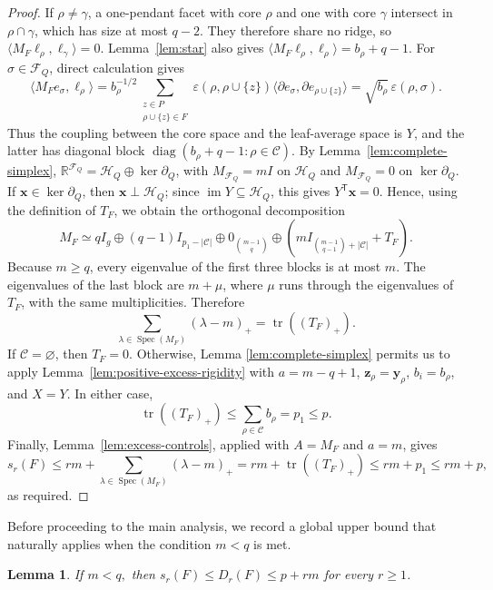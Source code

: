 \documentclass[11pt]{article}
\newtheorem{lemma}[theorem]{Lemma}
\newcommand{\tr}{\operatorname{tr}}
\newcommand{\Spec}{\operatorname{Spec}}
\newcommand{\im}{\operatorname{im}}
\newcommand{\Ker}{\operatorname{ker}}
\newcommand{\diag}{\operatorname{diag}}
\newcommand{\calC}{\mathcal{C}}
\newcommand{\calF}{\mathcal{F}}
\newcommand{\scrH}{\mathscr{H}}
\begin{document}
\begin{proof}
If \(\rho\neq\gamma\), a one-pendant facet with core \(\rho\) and one
with core \(\gamma\) intersect in \(\rho\cap\gamma\), which has size at
most \(q-2\). They therefore share no ridge, so
\(\langle M_F\boldsymbol{\ell}_\rho,
\boldsymbol{\ell}_\gamma\rangle=0\).
Lemma~\ref{lem:star} also gives
\(\langle M_F\boldsymbol{\ell}_\rho,
\boldsymbol{\ell}_\rho\rangle=b_\rho+q-1\).
For \(\sigma\in\calF_Q\), direct calculation gives
\[
\langle M_Fe_\sigma,\boldsymbol{\ell}_\rho\rangle
=
b_\rho^{-1/2}
\sum_{\substack{z\in P\\ \rho\cup\{z\}\in F}}
\varepsilon(\rho,\rho\cup\{z\})
\langle\partial e_\sigma,\partial e_{\rho\cup\{z\}}\rangle
=
\sqrt{b_\rho}\,\varepsilon(\rho,\sigma).
\]
Thus the coupling between the core space and the leaf-average space is
\(Y\), and the latter has diagonal block
\(\diag(b_\rho+q-1:\rho\in\calC)\).
By Lemma~\ref{lem:complete-simplex},
\(\mathbb R^{\calF_Q}=\scrH_Q\oplus\Ker\partial_Q\),
with \(M_{\calF_Q}=mI\) on \(\scrH_Q\) and \(M_{\calF_Q}=0\) on
\(\Ker\partial_Q\). If \(\mathbf x\in\Ker\partial_Q\), then
\(\mathbf x\perp\scrH_Q\); since \(\im Y\subseteq\scrH_Q\), this gives
\(Y^{\mathsf T}\mathbf x=0\). Hence, using the definition of \(T_F\),
we obtain the orthogonal decomposition
\[
M_F\simeq
qI_g
\oplus(q-1)I_{p_1-|\calC|}
\oplus0_{\binom{m-1}{q}}
\oplus
\left(
mI_{\binom{m-1}{q-1}+|\calC|}+T_F
\right).
\]
Because \(m\geq q\), every eigenvalue of the first three blocks is at
most \(m\). The eigenvalues of the last block are \(m+\mu\), where
\(\mu\) runs through the eigenvalues of \(T_F\), with the same
multiplicities. Therefore
\[
\sum_{\lambda\in\Spec(M_F)}(\lambda-m)_+
=
\tr((T_F)_+).
\]
If \(\calC=\varnothing\), then \(T_F=0\). Otherwise,
Lemma \ref{lem:complete-simplex} permits us to apply
Lemma~\ref{lem:positive-excess-rigidity} with
\(a=m-q+1\), \(\mathbf z_\rho=\mathbf y_\rho\),
\(b_i=b_\rho\), and \(X=Y\). In either case,
\[
\tr((T_F)_+)
\leq\sum_{\rho\in\calC}b_\rho
=p_1
\leq p.
\]
Finally, Lemma~\ref{lem:excess-controls}, applied with \(A=M_F\) and
\(a=m\), gives
\[
s_r(F)
\leq rm+\sum_{\lambda\in\Spec(M_F)}(\lambda-m)_+
=rm+\tr((T_F)_+)
\leq rm+p_1
\leq rm+p,
\]
as required.
\end{proof}
Before proceeding to the main analysis, we record a global upper bound that
naturally applies when the condition $m < q$ is met.
\begin{lemma}\label{lem:low-core-bounds}
	 If $m<q,$ then  $s_r(F)\le D_r(F)\le p+rm$ for every \(r\ge1\).
\end{lemma}
\end{document}
